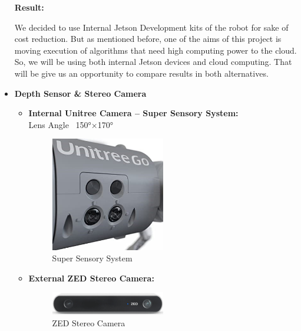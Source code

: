\documentclass[12pt]{article}
\begin{document}
\begin{itemize}
          \textbf{Result:}
          
          We decided to use Internal Jetson Development kits of the robot for sake of cost reduction. But as mentioned before, one of the aims of this project is moving execution of algorithms that need high computing power to the cloud. So, we will be using both internal Jetson devices and cloud computing. That will be give us an opportunity to compare results in both alternatives. 
          
    \item \textbf{Depth Sensor \& Stereo Camera}
          \begin{itemize}
              \item \textbf{Internal Unitree Camera – Super Sensory System:} \\
                    Lens Angle ~150°×170° 
                    
                    \begin{figure}[H]
                        \centering
                        \includegraphics[width=0.5\textwidth]{SuperSensorySystem.png}
                        \caption{Super Sensory System}
                    \end{figure}
                    
              \item \textbf{External ZED Stereo Camera:} \\
                    
                    \begin{figure}[H]
                        \centering
                        \includegraphics[width=0.5\textwidth]{ZEDCam.png}
                        \caption{ZED Stereo Camera~\cite{ZEDStereoCamera}}
                    \end{figure}
                    

\end{itemize}
\end{itemize}
\end{document}
